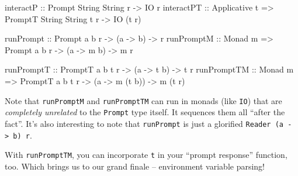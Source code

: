 \documentclass[]{article}
\newenvironment{Shaded}{}{}
\newcommand{\DataTypeTok}[1]{\textcolor[rgb]{0.56,0.13,0.00}{#1}}
\newcommand{\NormalTok}[1]{#1}
\newcommand{\OtherTok}[1]{\textcolor[rgb]{0.00,0.44,0.13}{#1}}
\begin{document}
\begin{Shaded}
\begin{Highlighting}[]
\OtherTok{interactP   ::}                  \DataTypeTok{Prompt}  \DataTypeTok{String} \DataTypeTok{String}\NormalTok{   r }\OtherTok{->} \DataTypeTok{IO}\NormalTok{ r}
\OtherTok{interactPT  ::} \DataTypeTok{Applicative}\NormalTok{ t }\OtherTok{=>} \DataTypeTok{PromptT} \DataTypeTok{String} \DataTypeTok{String}\NormalTok{ t r }\OtherTok{->} \DataTypeTok{IO}\NormalTok{ (t r)}

\OtherTok{runPrompt   ::}                  \DataTypeTok{Prompt}\NormalTok{  a b   r }\OtherTok{->}\NormalTok{ (a }\OtherTok{->}\NormalTok{   b) }\OtherTok{->}\NormalTok{ r}
\OtherTok{runPromptM  ::} \DataTypeTok{Monad}\NormalTok{ m       }\OtherTok{=>} \DataTypeTok{Prompt}\NormalTok{  a b   r }\OtherTok{->}\NormalTok{ (a }\OtherTok{->}\NormalTok{ m b) }\OtherTok{->}\NormalTok{ m r}

\OtherTok{runPromptT  ::}                  \DataTypeTok{PromptT}\NormalTok{ a b t r }\OtherTok{->}\NormalTok{ (a }\OtherTok{->}\NormalTok{    t b)  }\OtherTok{->}\NormalTok{ t r}
\OtherTok{runPromptTM ::} \DataTypeTok{Monad}\NormalTok{ m       }\OtherTok{=>} \DataTypeTok{PromptT}\NormalTok{ a b t r }\OtherTok{->}\NormalTok{ (a }\OtherTok{->}\NormalTok{ m (t b)) }\OtherTok{->}\NormalTok{ m (t r)}
\end{Highlighting}
\end{Shaded}

Note that \texttt{runPromptM} and \texttt{runPromptTM} can run in monads (like
\texttt{IO}) that are \emph{completely unrelated} to the \texttt{Prompt} type
itself. It sequences them all ``after the fact''. It's also interesting to note
that \texttt{runPrompt} is just a glorified
\texttt{Reader\ (a\ -\textgreater{}\ b)\ r}.

With \texttt{runPromptTM}, you can incorporate \texttt{t} in your ``prompt
response'' function, too. Which brings us to our grand finale -- environment
variable parsing!
\end{document}
